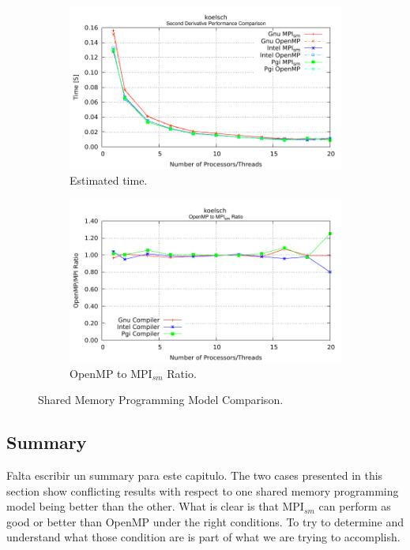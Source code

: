 \begin{figure} [t!]
    \centering
    \captionsetup{justification=centering, singlelinecheck=false}
    \begin{subfigure}{.6\textwidth}
      \centering
      \hspace*{-1.5cm} 
      \includegraphics[width=0.95\linewidth]{Plots/FirstTouch/koelsch.pdf}
      \caption[]{Estimated time.}
      \label{fig:sharedMemoryComparison3}
    \end{subfigure}%
    \begin{subfigure}{.6\textwidth}
      \centering
      \hspace*{-1.5cm} 
      \includegraphics[width=0.95\linewidth]{Plots/FirstTouch/koelschRatio.pdf}
      \caption{OpenMP to MPI$_{sm}$ Ratio.}
      \label{fig:sharedMemoryRatioComparison3}
    \end{subfigure}%
\caption{Shared Memory Programming Model Comparison.}
\label{fig:sharedMemoryProgrammingModel3}
\end{figure}




\subsection*{Summary}
Falta escribir un summary para este capitulo.
The two cases presented in this section show conflicting results with respect to one shared memory programming model being better than the other. What is clear is that MPI$_{sm}$ can perform as good or better than OpenMP under the right conditions. To try to determine and understand what those condition are is part of what we are trying to accomplish.

